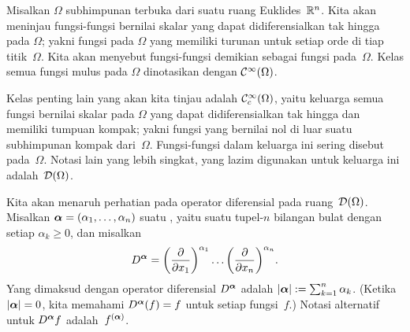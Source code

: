 \begin{notn}\label{mi_notn} Misalkan $\Omega$ subhimpunan terbuka dari suatu ruang Euklides~$\mathbb{R}^n$. Kita akan meninjau
fungsi-fungsi bernilai skalar yang dapat didiferensialkan
tak hingga pada $\Omega$; yakni fungsi pada $\Omega$ yang memiliki turunan untuk setiap orde di tiap titik~$\Omega$. Kita
akan menyebut fungsi-fungsi demikian sebagai
fungsi  pada~$\Omega$. Kelas semua fungsi mulus pada $\Omega$ dinotasikan dengan
$\mathcal{C}^\infty(\Omega)$.

Kelas penting lain yang akan kita tinjau
adalah $\mathcal{C}_c^\infty(\Omega)$, yaitu keluarga semua fungsi bernilai skalar pada $\Omega$ yang dapat didiferensialkan tak hingga dan memiliki tumpuan kompak;
yakni fungsi yang bernilai nol di luar suatu subhimpunan kompak dari~$\Omega$. Fungsi-fungsi dalam keluarga ini sering disebut
 pada~$\Omega$. Notasi lain yang lebih singkat,
yang lazim digunakan untuk keluarga ini adalah~$\mathcal{D}(\Omega)$.

Kita akan menaruh perhatian pada operator diferensial pada ruang~$\mathcal{D}(\Omega)$. Misalkan $\boldsymbol{\alpha} = (\alpha_1, \dots, \alpha_n)$ suatu
, yaitu suatu tupel-$n$ bilangan bulat dengan setiap $\alpha_k \ge 0$, dan misalkan
  \[ D^{\boldsymbol{\alpha}} = \biggl(\frac{\partial}{\partial x_1}\biggr)^{\alpha_1} \dots
                                                     \biggl(\frac{\partial}{\partial x_n}\biggr)^{\alpha_n}. \]
Yang dimaksud dengan
%
 operator diferensial $D^{\boldsymbol{\alpha}}$ adalah $\lvert\boldsymbol{\alpha}\rvert := \sum_{k=1}^n \alpha_k$. (Ketika
$\lvert\boldsymbol{\alpha}\rvert = 0$, kita memahami $D^{\boldsymbol{\alpha}}(f) = f$ untuk setiap fungsi~$f$.) Notasi alternatif untuk
$D^{\boldsymbol{\alpha}}f$ adalah~$f^{(\boldsymbol{\alpha})}$.
\end{notn}

